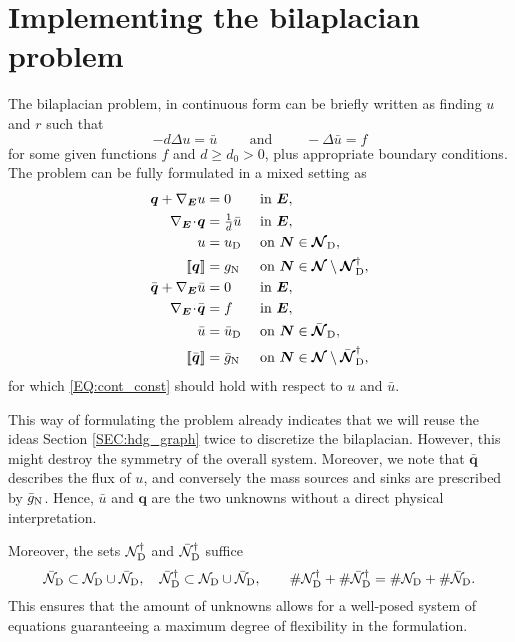 \documentclass[a4paper, english, 12pt, reqno, draft]{amsart}
\theoremstyle{definition}
\theoremstyle{remark}
\numberwithin{equation}{section}
\newcommand{\setNode}{\ensuremath{\mathcal N}}
\newcommand{\setNodeDir}{\ensuremath{\setNode_\textup D}}
\newcommand{\setNodeBar}{\ensuremath{\bar{\mathcal N}}}
\newcommand{\setNodeDirBar}{\ensuremath{\setNodeBar_\textup D}}
\newcommand{\SetNode}{\ensuremath{\boldsymbol{\mathcal N}}}
\newcommand{\SetNodeDir}{\ensuremath{\SetNode_\textup D}}
\newcommand{\SetNodeBar}{\ensuremath{\bar{\boldsymbol{\mathcal N}}}}
\newcommand{\SetNodeDirBar}{\ensuremath{\SetNodeBar_\textup D}}
\newcommand{\Edge}{{\ensuremath{\boldsymbol E}}}
\newcommand{\Node}{{\ensuremath{\boldsymbol N}}}
\newcommand{\Nabla}{\ensuremath{\nabla_\Edge}}
\newcommand{\Div}{\ensuremath{\Nabla\!\cdot\!}}
\newcommand{\jump}[1]{{[\![ #1 ]\!]}}
\renewcommand{\vec}[1]{\ensuremath{\boldsymbol{#1}}}
\begin{document}
\section{Implementing the bilaplacian problem}
% 
The bilaplacian problem, in continuous form can be briefly written as finding $u$ and $r$ such that
% 
\begin{equation*}
 -d \Delta u = \bar u \qquad \text{ and } \qquad -\Delta \bar u = f
\end{equation*}
% 
for some given functions $f$ and $d \ge d_0 > 0$, plus appropriate boundary conditions. The problem can be fully formulated in a mixed setting as
% 
\begin{subequations}\label{EQ:bilap}
\begin{align}
 \vec q + \Nabla u & = 0 && \text{ in } \Edge,\\
 \Div \vec q & = \tfrac{1}{d} \bar u && \text{ in } \Edge,\\
 u & = u_\textup D && \text{ on } \Node \in \SetNodeDir,\\
 \jump{\vec q} & = g_\textup N && \text{ on } \Node \in \SetNode \setminus \SetNodeDir^\dagger,\\
 \bar{\vec q} + \Nabla \bar u & = 0 && \text{ in } \Edge,\\
 \Div \bar{\vec q} & = f && \text{ in } \Edge,\label{EQ:bilap_f}\\
 \bar u & = \bar u_\textup D && \text{ on } \Node \in \SetNodeDirBar,\\
 \jump{\bar{\vec q}} & = \bar g_\textup N && \text{ on } \Node \in \SetNode \setminus \SetNodeDirBar^\dagger,
\end{align}
\end{subequations}
% 
for which \eqref{EQ:cont_const} should hold with respect to $u$ and $\bar u$.

This way of formulating the problem already indicates that we will reuse the ideas Section \ref{SEC:hdg_graph} twice to discretize the bilaplacian. However, this might destroy the symmetry of the overall system. Moreover, we note that $\bar{\vec q}$ describes the flux of $u$, and conversely the mass sources and sinks are prescribed by $\bar g_\textup N$. Hence, $\bar u$ and $\vec q$ are the two unknowns without a direct physical interpretation. 

Moreover, the sets $\setNodeDir^\dagger$ and $\setNodeDirBar^\dagger$ suffice
% 
\begin{equation}
 \setNodeDirBar \subset \setNodeDir \cup \setNodeDirBar, \quad \setNodeDirBar^\dagger \subset \setNodeDir \cup \setNodeDirBar, \qquad \# \setNodeDir^\dagger + \# \setNodeDirBar^\dagger = \# \setNodeDir + \# \setNodeDirBar.
\end{equation}
% 
This ensures that the amount of unknowns allows for a well-posed system of equations guaranteeing a maximum degree of flexibility in the formulation.
% 
\end{document}
